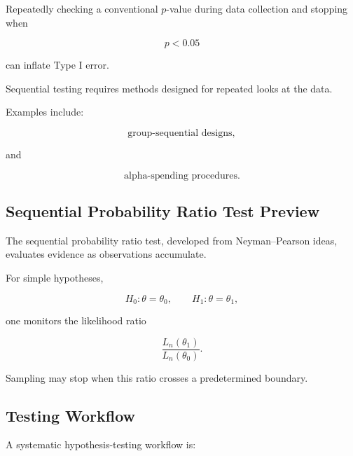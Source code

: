 Repeatedly checking a conventional \(p\)-value during data collection and
stopping when

\[
p<0.05
\]

can inflate Type I error.

Sequential testing requires methods designed for repeated looks at the
data.

Examples include:

\[
\boxed{
\text{group-sequential designs},
}
\]

and

\[
\boxed{
\text{alpha-spending procedures}.
}
\]

\subsection{Sequential Probability Ratio Test Preview}
\label{subsec:sprt-preview}

The sequential probability ratio test, developed from
Neyman--Pearson ideas, evaluates evidence as observations accumulate.

For simple hypotheses,

\[
H_0:\theta=\theta_0,
\qquad
H_1:\theta=\theta_1,
\]

one monitors the likelihood ratio

\[
\boxed{
\frac{
L_n(\theta_1)
}{
L_n(\theta_0)
}.
}
\]

Sampling may stop when this ratio crosses a predetermined boundary.

\subsection{Testing Workflow}
\label{subsec:hypothesis-testing-workflow}

A systematic hypothesis-testing workflow is:

